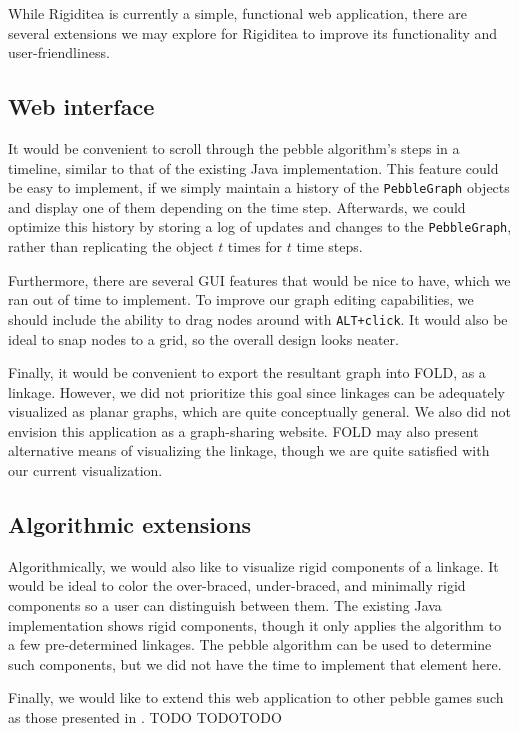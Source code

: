 \documentclass[aps,prd,final,twocolumn,letterpaper,nofootinbib]{revtex4-1}
\begin{document}
While Rigiditea is currently a simple, functional web application,
there are several extensions we may explore for Rigiditea
to improve its functionality and user-friendliness.

\subsection{Web interface}

It would be convenient to scroll through the pebble algorithm's steps
in a timeline, similar to that of the existing Java implementation.
This feature could be easy to implement,
if we simply maintain a history of the \texttt{PebbleGraph} objects
and display one of them depending on the time step.
Afterwards, we could optimize this history by storing a log
of updates and changes to the \texttt{PebbleGraph},
rather than replicating the object $t$ times for $t$ time steps.

Furthermore, there are several GUI features that would be nice to have,
which we ran out of time to implement.
To improve our graph editing capabilities,
we should include the ability to drag nodes around with \texttt{ALT+click}.
It would also be ideal to snap nodes to a grid,
so the overall design looks neater.

Finally, it would be convenient to export the resultant graph into FOLD,
as a linkage. However, we did not prioritize this goal since
linkages can be adequately visualized as planar graphs,
which are quite conceptually general.
We also did not envision this application as a graph-sharing website.
FOLD may also present alternative means of visualizing the linkage,
though we are quite satisfied with our current visualization.

\subsection{Algorithmic extensions}

Algorithmically, we would also like to visualize rigid components of a linkage.
It would be ideal to color the over-braced,
under-braced, and minimally rigid components so a user
can distinguish between them.
The existing Java implementation shows rigid components,
though it only applies the algorithm to a few pre-determined linkages.
The pebble algorithm can be used to determine such components,
but we did not have the time to implement that element here.

Finally, we would like to extend this web application to other pebble games
such as those presented in \cite{lee08, chubynsky07}.
TODO TODOTODO
\end{document}
